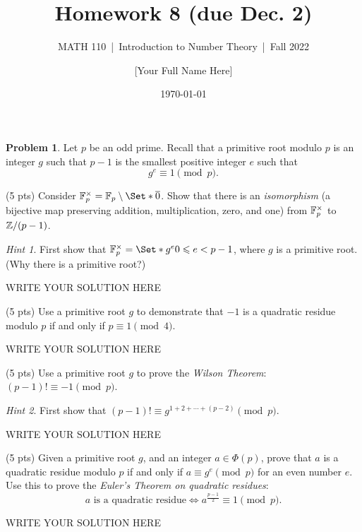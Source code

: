 \documentclass[11pt]{article}
\title{Homework 8 (due Dec. 2)}
\author{[Your Full Name Here]}
\subtitle{MATH 110~|~Introduction to Number Theory~|~Fall 2022}
\date{\today}
\theoremstyle{plain}
\theoremstyle{definition}
\newtheorem{problem}{Problem}
\theoremstyle{remark}
\newtheorem*{hint}{Hint}
\numberwithin{equation}{problem}
\providecommand\given{}
\begin{document}
\maketitle

\begin{problem}
	Let $p$ be an odd prime. 
	Recall that a primitive root modulo $p$ is an integer $g$ such that $p-1$ is the smallest positive integer $e$ such that
	\[
		g^{e} \equiv 1 \pmod{p}.
	\] 
	\begin{listinprob}
	\item (5 pts) Consider $\F_p^\times = \F_p \setminus \Set*{\overline{0}}$. Show that there is an \emph{isomorphism} (a bijective map preserving addition, multiplication, zero, and one) from $\mathbb{F}_p^\times$ to $\mathbb{Z}/(p-1)$.
	\begin{hint}
		First show that $\F_p^\times = \Set*{ g^e \given 0\le e< p-1 }$, where $g$ is a primitive root. (Why there is a primitive root?)
	\end{hint}
\begin{solution} %
WRITE YOUR SOLUTION HERE
\end{solution}\clearpage %

	
	\item (5 pts) Use a primitive root $g$ to demonstrate that $-1$ is a quadratic residue modulo $p$ if and only if $p \equiv 1 \pmod{4}$.
\begin{solution} %
WRITE YOUR SOLUTION HERE
\end{solution}\clearpage %

	
	\item (5 pts) Use a primitive root $g$ to prove the \emph{Wilson Theorem}: $(p-1)!\equiv -1\pmod{p}$.
	\begin{hint}
		First show that $(p-1)! \equiv g^{1+2+\cdots+(p-2)}\pmod{p}$.
	\end{hint}
\begin{solution} %
WRITE YOUR SOLUTION HERE
\end{solution}\clearpage %


	\item (5 pts) Given a primitive root $g$, and an integer $a\in\Phi(p)$, prove that $a$ is a quadratic residue modulo $p$ if and only if $a \equiv g^e \pmod{p}$ for an even number $e$. Use this to prove the \emph{Euler's Theorem on quadratic residues}:
	\[
		\text{$a$ is a quadratic residue} \iff a^{\frac{p-1}{2}}\equiv 1\pmod{p}.
	\]
	\end{listinprob} 
\end{problem}
\begin{solution} %
WRITE YOUR SOLUTION HERE
\end{solution}\clearpage %
\end{document}
